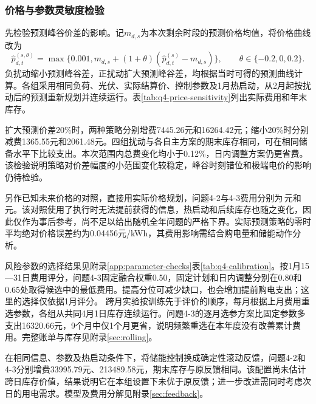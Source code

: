 \subsubsection{价格与参数灵敏度检验}
先检验预测峰谷价差的影响。记$m_{d,s}$为本次剩余时段的预测价格均值，将价格曲线改为
\begin{equation}
 \widehat p^{(s,\theta)}_{d,t}
 =\max\{0.001,m_{d,s}+(1+\theta)
       (\widehat p^{(s)}_{d,t}-m_{d,s})\},\qquad
 \theta\in\{-0.2,0,0.2\}.\label{eq:price-sensitivity}
\end{equation}
负扰动缩小预测峰谷差，正扰动扩大预测峰谷差，均根据当时可得的预测曲线计算。各组采用相同负荷、光伏、实际结算价、控制参数及1月热启动，从2月起按扰动后的预测重新规划并连续运行。表\ref{tab:q4-price-sensitivity}列出实际费用和年末库存。

\FloatBarrier
扩大预测价差20\%时，两种策略分别增费7445.26元和16264.42元；缩小20\%时分别减费1365.55元和2061.48元。四组扰动与各自主方案的期末库存相同，可在相同储备水平下比较支出。本次范围内总费变化均小于0.12\%，日内调整方案仍更省费。该检验说明策略对价差幅度的小范围变化较稳定，峰谷时刻错位和极端电价的影响仍待检验。

另作已知未来价格的对照，直接用实际价格规划，问题4-2与4-3费用分别为\,元和\,元。该对照使用了执行时无法提前获得的信息，热启动和后续库存也随之变化，因此仅作为事后参考，尚不足以给出随机全年问题的严格下界。实际预测策略的零时平均绝对价格误差约为0.04456元/kWh，其费用影响需结合购电量和储能动作分析。

风险参数的选择结果见附录\ref{app:parameter-checks}表\ref{tab:q4-calibration}。按1月15—31日费用评分，问题4-3固定融合权重0.50，固定计划和日内调整分别在0.80和0.65处取得候选中的最低费用。提高分位可减少缺口，也会增加提前购电支出；这里的选择仅依据1月评分。
\FloatBarrier
跨月实验按训练先于评价的顺序，每月根据上月费用重选参数，各组从共同4月1日库存连续运行。问题4-3的逐月选参方案比固定参数多支出16320.66元，9个月中仅1个月更省，说明频繁重选在本年度没有改善累计费用。完整账单与库存见附录\ref{sec:rolling}。

在相同信息、参数及热启动条件下，将储能控制换成确定性滚动反馈，问题4-2和4-3分别增费33995.79元、213489.58元，期末库存与原反馈相同。该配置尚未估计跨日库存价值，结果说明它在本组设置下未优于原反馈；进一步改进需同时考虑次日的用电需求。模型及费用分解见附录\ref{sec:feedback}。
\label{end:q4}

